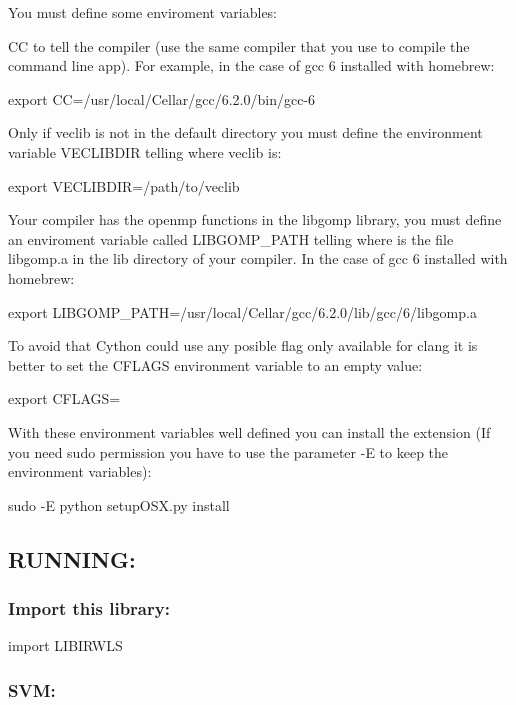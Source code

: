 You must define some enviroment variables\+:

CC to tell the compiler (use the same compiler that you use to compile the command line app). For example, in the case of gcc 6 installed with homebrew\+: \begin{DoxyVerb}export CC=/usr/local/Cellar/gcc/6.2.0/bin/gcc-6
\end{DoxyVerb}


Only if veclib is not in the default directory you must define the environment variable V\+E\+C\+L\+I\+B\+D\+IR telling where veclib is\+: \begin{DoxyVerb}export VECLIBDIR=/path/to/veclib
\end{DoxyVerb}


Your compiler has the openmp functions in the libgomp library, you must define an enviroment variable called L\+I\+B\+G\+O\+M\+P\+\_\+\+P\+A\+TH telling where is the file libgomp.\+a in the lib directory of your compiler. In the case of gcc 6 installed with homebrew\+: \begin{DoxyVerb}export LIBGOMP_PATH=/usr/local/Cellar/gcc/6.2.0/lib/gcc/6/libgomp.a
\end{DoxyVerb}


To avoid that Cython could use any posible flag only available for clang it is better to set the C\+F\+L\+A\+GS environment variable to an empty value\+: \begin{DoxyVerb}export CFLAGS=
\end{DoxyVerb}


With these environment variables well defined you can install the extension (If you need sudo permission you have to use the parameter -\/E to keep the environment variables)\+: \begin{DoxyVerb}sudo -E python setupOSX.py install
\end{DoxyVerb}


\subsection*{R\+U\+N\+N\+I\+NG\+:}

\subsubsection*{Import this library\+:}

\begin{DoxyVerb}    import LIBIRWLS
\end{DoxyVerb}


\subsubsection*{S\+VM\+:}

